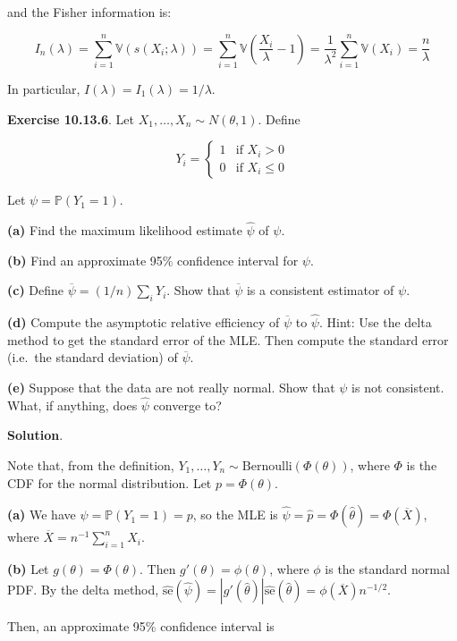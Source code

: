 and the Fisher information is:

\[ I_n(\lambda) = \sum_{i=1}^n \mathbb{V}\left( s(X_i; \lambda) \right) 
= \sum_{i=1}^n \mathbb{V} \left( \frac{X_i}{\lambda} - 1 \right)
= \frac{1}{\lambda^2}  \sum_{i=1}^n \mathbb{V}(X_i) = \frac{n}{\lambda}\]

In particular, \(I(\lambda) = I_1(\lambda) = 1 / \lambda\).

\textbf{Exercise 10.13.6}. Let \(X_1, \dots, X_n \sim N(\theta, 1)\).
Define

\[Y_i = \begin{cases}
1 & \text{if } X_i > 0 \\
0 & \text{if } X_i \leq 0
\end{cases}\]

Let \(\psi = \mathbb{P}(Y_1 = 1)\).

\textbf{(a)} Find the maximum likelihood estimate \(\hat{\psi}\) of
\(\psi\).

\textbf{(b)} Find an approximate 95\% confidence interval for \(\psi\).

\textbf{(c)} Define \(\overline{\psi} = (1 / n) \sum_i Y_i\). Show that
\(\overline{\psi}\) is a consistent estimator of \(\psi\).

\textbf{(d)} Compute the asymptotic relative efficiency of
\(\overline{\psi}\) to \(\hat{\psi}\). Hint: Use the delta method to get
the standard error of the MLE. Then compute the standard error (i.e.~the
standard deviation) of \(\overline{\psi}\).

\textbf{(e)} Suppose that the data are not really normal. Show that
\(\psi\) is not consistent. What, if anything, does \(\hat{\psi}\)
converge to?

\textbf{Solution}.

Note that, from the definition,
\(Y_1, \dots, Y_n \sim \text{Bernoulli}(\Phi(\theta))\), where \(\Phi\)
is the CDF for the normal distribution. Let \(p = \Phi(\theta)\).

\textbf{(a)} We have \(\psi = \mathbb{P}(Y_1 = 1) = p\), so the MLE is
\(\hat{\psi} = \hat{p} = \Phi(\hat{\theta})
= \Phi(\overline{X})\), where
\(\overline{X} = n^{-1} \sum_{i=1}^n X_i\).

\textbf{(b)} Let \(g(\theta) = \Phi(\theta)\). Then
\(g'(\theta) = \phi(\theta)\), where \(\phi\) is the standard normal
PDF. By the delta method,
\(\hat{\text{se}}(\hat{\psi}) = |g'(\hat{\theta})| \hat{\text{se}}(\hat{\theta}) = \phi(\overline{X}) n^{-1/2}\).

Then, an approximate 95\% confidence interval is

